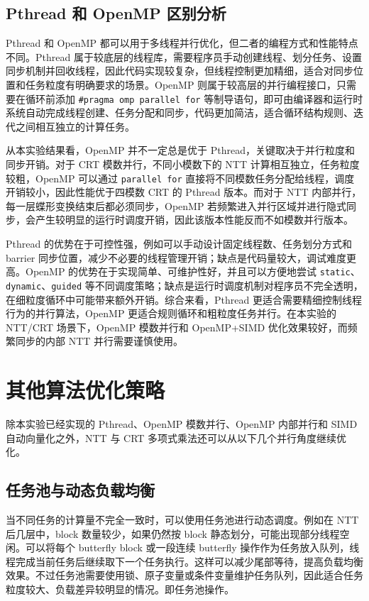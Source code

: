 \documentclass[a4paper]{article}
\begin{document}
\subsection{Pthread 和 OpenMP 区别分析}

Pthread 和 OpenMP 都可以用于多线程并行优化，但二者的编程方式和性能特点不同。Pthread 属于较底层的线程库，需要程序员手动创建线程、划分任务、设置同步机制并回收线程，因此代码实现较复杂，但线程控制更加精细，适合对同步位置和任务粒度有明确要求的场景。OpenMP 则属于较高层的并行编程接口，只需要在循环前添加 \texttt{\#pragma omp parallel for} 等制导语句，即可由编译器和运行时系统自动完成线程创建、任务分配和同步，代码更加简洁，适合循环结构规则、迭代之间相互独立的计算任务。

从本实验结果看，OpenMP 并不一定总是优于 Pthread，关键取决于并行粒度和同步开销。对于 CRT 模数并行，不同小模数下的 NTT 计算相互独立，任务粒度较粗，OpenMP 可以通过 \texttt{parallel for} 直接将不同模数任务分配给线程，调度开销较小，因此性能优于四模数 CRT 的 Pthread 版本。而对于 NTT 内部并行，每一层蝶形变换结束后都必须同步，OpenMP 若频繁进入并行区域并进行隐式同步，会产生较明显的运行时调度开销，因此该版本性能反而不如模数并行版本。

Pthread 的优势在于可控性强，例如可以手动设计固定线程数、任务划分方式和 barrier 同步位置，减少不必要的线程管理开销；缺点是代码量较大，调试难度更高。OpenMP 的优势在于实现简单、可维护性好，并且可以方便地尝试 \texttt{static}、\texttt{dynamic}、\texttt{guided} 等不同调度策略；缺点是运行时调度机制对程序员不完全透明，在细粒度循环中可能带来额外开销。综合来看，Pthread 更适合需要精细控制线程行为的并行算法，OpenMP 更适合规则循环和粗粒度任务并行。在本实验的 NTT/CRT 场景下，OpenMP 模数并行和 OpenMP+SIMD 优化效果较好，而频繁同步的内部 NTT 并行需要谨慎使用。

\section{其他算法优化策略}

除本实验已经实现的 Pthread、OpenMP 模数并行、OpenMP 内部并行和 SIMD 自动向量化之外，NTT 与 CRT 多项式乘法还可以从以下几个并行角度继续优化。


\subsection{任务池与动态负载均衡}

当不同任务的计算量不完全一致时，可以使用任务池进行动态调度。例如在 NTT 后几层中，block 数量较少，如果仍然按 block 静态划分，可能出现部分线程空闲。可以将每个 butterfly block 或一段连续 butterfly 操作作为任务放入队列，线程完成当前任务后继续取下一个任务执行。这样可以减少尾部等待，提高负载均衡效果。不过任务池需要使用锁、原子变量或条件变量维护任务队列，因此适合任务粒度较大、负载差异较明显的情况。即任务池操作。
\end{document}
